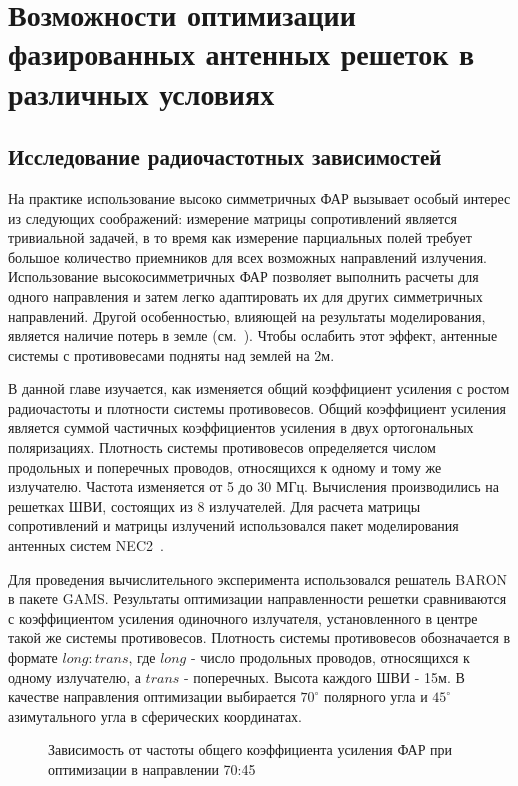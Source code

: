 \chapter{Возможности оптимизации фазированных антенных решеток в различных условиях}\label{sec:radio}

\section{Исследование радиочастотных зависимостей}
 На практике использование высоко симметричных ФАР вызывает особый интерес из следующих соображений: измерение матрицы сопротивлений является тривиальной задачей, в то время как измерение парциальных полей требует большое количество приемников для всех возможных направлений излучения. Использование высокосимметричных ФАР позволяет выполнить расчеты для одного направления и затем легко адаптировать их для других симметричных направлений. Другой особенностью, влияющей на результаты моделирования, является наличие потерь в земле (см.~\cite{yurkov:groundloss}). Чтобы ослабить этот эффект, антенные системы с противовесами подняты над землей на 2м.

В данной главе изучается, как изменяется общий коэффициент усиления с ростом радиочастоты и плотности системы противовесов. Общий коэффициент усиления является суммой частичных коэффициентов усиления в  двух ортогональных поляризациях. Плотность системы противовесов определяется числом продольных и поперечных проводов, относящихся к одному и тому же излучателю. Частота изменяется от 5 до 30 МГц. Вычисления производились на решетках ШВИ, состоящих из 8 излучателей. Для расчета матрицы сопротивлений и матрицы излучений использовался пакет моделирования антенных систем NEC2~\cite{bruke:nec2}.

Для проведения вычислительного эксперимента использовался решатель BARON в пакете GAMS. Результаты оптимизации направленности решетки сравниваются с коэффициентом усиления одиночного излучателя, установленного в центре такой же системы противовесов. Плотность системы противовесов обозначается в формате $long:trans$, где $long$ - число продольных проводов, относящихся к одному излучателю, а $trans$ - поперечных. Высота каждого ШВИ - 15м. В качестве направления оптимизации выбирается $70^{\circ}$ полярного угла и $45^{\circ}$ азимутального угла в сферических координатах.

\begin{figure}
\caption{Зависимость от частоты общего коэффициента усиления ФАР при оптимизации в направлении 70:45}
\label{ris:paa_gains}
\end{figure}

